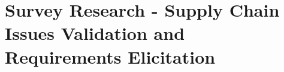 \chapter{Survey Research - Supply Chain Issues Validation and Requirements Elicitation}
\label{chap:survey}
\minitoc \mtcskip \noindent






